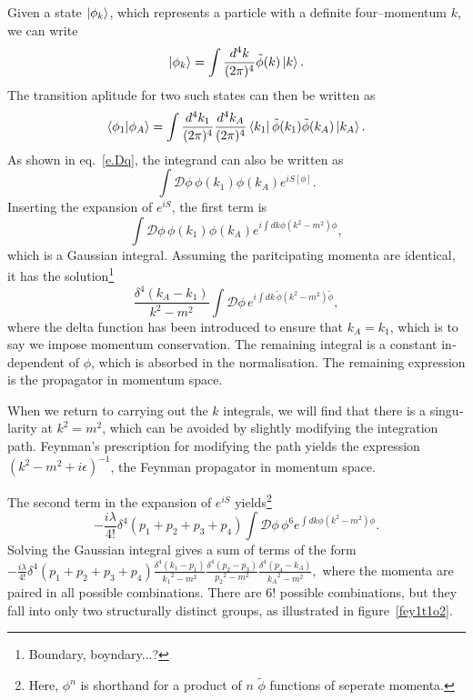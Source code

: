 


\begin{english}

Given a state $\left| \phi_k \right\rangle$, which represents a particle with a definite four--momentum $k$, we can write
\[\left| \phi_k \right\rangle=\int\frac{d^4k}{(2\pi)^4}\tilde\phi(k)\left| k \right\rangle.\]
The transition aplitude for two such states can then be written as
\[\left\langle\phi_1\middle|\phi_A\right\rangle=\int\frac{d^4k_1}{(2\pi)^4}\frac{d^4k_A}{(2\pi)^4}\left\langle k_1 \right|\tilde\phi(k_1)\tilde\phi(k_A)\left| k_A \right\rangle.\]
As shown in eq.~\eqref{e.Dq}, the integrand can also be written as
\[\int\mathcal D\phi\, \phi(k_1)\phi(k_A)e^{iS[\phi]}.\]
Inserting the expansion of $e^{iS}$, the first term is
\[\int\mathcal D\phi\,\phi(k_1)\phi(k_A)e^{i\int dk\phi(k^2-m^2)\phi},\]
which is a Gaussian integral. Assuming the paritcipating momenta are identical, it has the solution\footnote{Boundary, boyndary...?} \cite{griffiths:gauss}
\[\frac{\delta^4(k_A-k_1)}{k^2-m^2}\int\mathcal D\phi\,e^{i\int dk\,\tilde\phi(k^2-m^2)\tilde\phi},\] 
where the delta function has been introduced to ensure that $k_A=k_1$, which is to say we impose momentum conservation. The remaining integral is a constant independent of $\phi$, which is absorbed in the normalisation. The remaining expression is the propagator in momentum space. 
 
When we return to carrying out the $k$ integrals, we will find that there is a singularity at $k^2=m^2$, which can be avoided by slightly modifying the integration path. Feynman's prescription for modifying the path yields the expression $(k^2-m^2+i\epsilon)^{-1}$, the Feynman propagator in momentum space. 

The second term in the expansion of $e^{iS}$ yields\footnote{Here, $\phi^n$ is shorthand for a product of $n$ $\tilde\phi$ functions of seperate momenta.} 
\[-\frac{i\lambda}{4!}\delta^4(p_1+p_2+p_3+p_4)\int\mathcal D\phi\,\phi^6e^{\int dk \phi(k^2-m^2)\phi}.\] 
Solving the Gaussian integral gives a sum of terms of the form 
\(-\frac{i\lambda}{4!}\delta^4(p_1+p_2+p_3+p_4)\frac{\delta^4(k_1-p_1)}{{k_1}^2-m^2}\frac{\delta^4(p_2-p_3)}{{p_2}^2-m^2}\frac{\delta^4(p_4-k_A)}{{k_A}^2-m^2},\label{1t1f}\)
where the momenta are paired in all possible combinations. There are $6!$ possible combinations, but they fall into only two structurally distinct groups, as illustrated in figure~\ref{fey1t1o2}.


\end{english}
